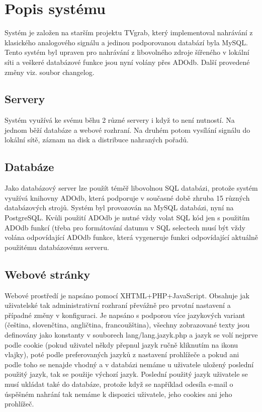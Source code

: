 \chapter{Popis systému}

Systém je založen na starším projektu TVgrab, který implementoval nahrávání z klasického analogového signálu a jedinou podporovanou databází byla MySQL. Tento systém byl upraven pro nahrávání z libovolného zdroje šířeného v lokální síti a veškeré databázové funkce jsou nyní volány přes ADOdb. Další provedené změny viz. soubor changelog.

\vspace{10pt}

\section{Servery}
Systém využívá ke svému běhu 2 různé servery i když to není nutností. Na jednom běží databáze a webové rozhraní. Na druhém potom vysílání signálu do lokální sítě, záznam na disk a distribuce nahraných pořadů.

\vspace{10pt}

\section{Databáze}

\vspace{10pt}

Jako databázový server lze použít téměř libovolnou SQL databázi, protože systém využívá knihovny ADOdb, která podporuje v současné době zhruba 15 různých databázových strojů. Systém byl provozován na MySQL databázi, nyní na PostgreSQL. Kvůli použití ADOdb je nutné vždy volat SQL kód jen s použitím ADOdb funkcí (třeba pro formátování datumu v SQL selectech musí být vždy volána odpovídající ADOdb funkce, která vygeneruje funkci odpovídající aktuálně použitému databázovému serveru.

\vspace{10pt}

\section{Webové stránky}

\vspace{10pt}

Webové prostředí je napsáno pomocí XHTML+PHP+JavaScript. Obsahuje jak uživatelské tak administrativní rozhraní převážně pro prvotní nastavení a případné změny v konfiguraci. Je napsáno s podporou více jazykových variant (čeština, slovenčtina, angličtina, francoužština), všechny zobrazované texty jsou definovány jako konstanty v souborech lang/lang.jazyk.php a jazyk se volí nejprve podle cookie (pokud uživatel někdy přepnul jazyk ručně kliknutím na ikonu vlajky), poté podle preferovaných jazyků z nastavení prohlížeče a pokud ani podle toho se nenajde vhodný a v databázi nemáme u uživatele uložený poslední použitý jazyk, tak se použije výchozí jazyk. Poslední použitý jazyk uživatele se musí ukládat také do databáze, protože když se například odesíla e-mail o úspěšném nahrání tak nemáme k dispozici uživatele, jeho cookies ani jeho prohlížeč.


